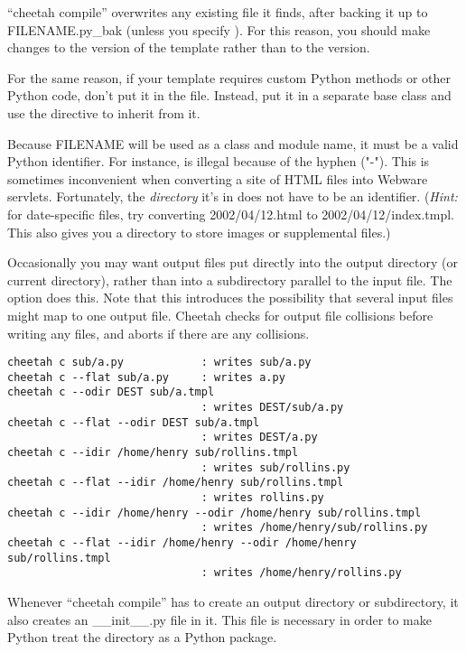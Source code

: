 ``cheetah compile'' overwrites any existing  file it finds, after
backing it up to FILENAME.py\_bak (unless you specify ).  For
this reason, you should make changes to the  version of the
template rather than to the  version.

For the same reason, if your template requires custom Python methods or
other Python code, don't put it in the  file.  Instead, put
it in a separate base class and use the  directive to
inherit from it.

Because FILENAME will be used as a class and module name, it must be a valid
Python identifier.  For instance,  is 
illegal because of the hyphen ("-").  This is sometimes inconvenient when
converting a site of HTML files into Webware servlets.  Fortunately, the
{\em directory} it's in does not have to be an identifier.  ({\em Hint:} for
date-specific files, try converting 2002/04/12.html to 2002/04/12/index.tmpl.
This also gives you a directory to store images or supplemental files.)

Occasionally you may want output files put directly into the output directory
(or current directory), rather than into a subdirectory parallel to the input
file.  The  option does this.  Note that this introduces the
possibility that several input files might map to one output file.  Cheetah
checks for output file collisions before writing any files, and aborts if there
are any collisions.
\begin{verbatim}
cheetah c sub/a.py            : writes sub/a.py
cheetah c --flat sub/a.py     : writes a.py
cheetah c --odir DEST sub/a.tmpl
                              : writes DEST/sub/a.py
cheetah c --flat --odir DEST sub/a.tmpl
                              : writes DEST/a.py
cheetah c --idir /home/henry sub/rollins.tmpl
                              : writes sub/rollins.py
cheetah c --flat --idir /home/henry sub/rollins.tmpl
                              : writes rollins.py
cheetah c --idir /home/henry --odir /home/henry sub/rollins.tmpl
                              : writes /home/henry/sub/rollins.py
cheetah c --flat --idir /home/henry --odir /home/henry sub/rollins.tmpl
                              : writes /home/henry/rollins.py
\end{verbatim}

Whenever ``cheetah compile'' has to create an output directory or subdirectory, it
also creates an \_\_init\_\_.py file in it.  This file is necessary
in order to make Python treat the directory as a Python package.

